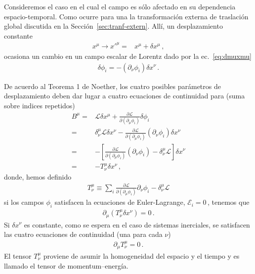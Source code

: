 \begin{frame}
  Consideremos el caso en el cual el campo es sólo afectado en su dependencia espacio-temporal. Como ocurre para una la transformación externa de traslación global
  discutida en la Sección~\ref{sec:tranf-extern}. Allí, un desplazamiento constante
\begin{align}
  x^\mu\to{x'}^\mu=&x^\mu+\delta x^{\mu}\,,
\end{align}
ocasiona un cambio en
  un campo escalar de Lorentz dado por la ec.~\eqref{eq:dmuxmu}
  \begin{align}
    \delta\phi_{i}=-\left( \partial_{\nu}\phi_i \right)\delta x^{\nu}\,.
  \end{align}

  De acuerdo al Teorema 1 de Noether, los cuatro posibles parámetros de desplazamiento deben dar lugar a cuatro ecuaciones de continuidad para (suma sobre indices repetidos)
\begin{align}
     B^{\mu}=& \mathcal{L} \delta x^{\mu} + \frac{\partial\mathcal{L}}{\partial(\partial_{\mu}\phi_i)}\delta\phi_{i} \nonumber\\
  =&\delta_{\nu}^{\mu} \mathcal{L} \delta x^{\nu} - \frac{\partial\mathcal{L}}{\partial(\partial_{\mu}\phi_i)} \left( \partial_{\nu}\phi_i \right)\delta x^{\nu}   \nonumber\\
  =&- \left[\frac{\partial\mathcal{L}}{\partial(\partial_{\mu}\phi_i)} \left( \partial_{\nu}\phi_i \right) - \delta_{\nu}^{\mu} \mathcal{L} \right] \delta x^{\nu}   \nonumber\\
  =&    - T^{\mu}_{\nu} \delta x^{\nu}\,,
\end{align}
donde, hemos definido
\begin{align}
  T^{\mu}_{\nu}\equiv\sum_i \frac{\partial\mathcal{L}}{\partial(\partial_{\mu}\phi_i)}\partial_{\nu}\phi_i-\delta^{\mu}_{\nu}\mathcal{L}
\end{align}
si los campos $\phi_{i}$ satisfacen la ecuaciones de Euler-Lagrange, $\mathcal{E}_i=0\,$, tenemos que
\begin{align}
  \partial_{\mu} \left( T^{\mu}_{\nu} \delta x^{\nu}\right)=0\,.
\end{align}
Si $\delta x^{\nu}$ es constante, como se espera en el caso de sistemas inerciales, se satisfacen las cuatro  ecuaciones de continuidad (una para cada $\nu$)
\begin{align}
  \partial_{\mu} T^{\mu}_{\nu}=0\,.
\end{align}
El tensor $T^\mu_\nu$ proviene de asumir la homogeneidad del espacio y el tiempo y es llamado el tensor de momentum--energía. 
\end{frame}

